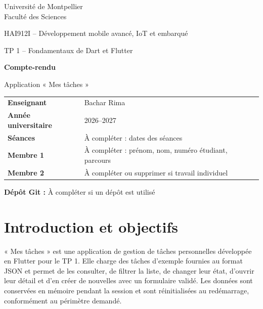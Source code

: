\documentclass[12pt,a4paper]{report}
\begin{document}
\begin{titlepage}
  \centering
  \vspace*{1.2cm}
  {\Large Université de Montpellier\\Faculté des Sciences\par}
  \vspace{1.4cm}
  {\large HAI912I -- Développement mobile avancé, IoT et embarqué\par}
  \vspace{0.4cm}
  {\large TP 1 -- Fondamentaux de Dart et Flutter\par}
  \vspace{1.5cm}
  {\Huge\bfseries Compte-rendu\par}
  \vspace{0.5cm}
  {\LARGE Application « Mes tâches »\par}
  \vspace{1.4cm}
  \begin{tabular}{>{\bfseries}p{4.2cm}p{9cm}}
    Enseignant & Bachar Rima\\
    Année universitaire & 2026--2027\\
    Séances & \textcolor{red!70!black}{À compléter : dates des séances}\\
    Membre 1 & \textcolor{red!70!black}{À compléter : prénom, nom, numéro étudiant, parcours}\\
    Membre 2 & \textcolor{red!70!black}{À compléter ou supprimer si travail individuel}\\
  \end{tabular}
  \vfill
  \textbf{Dépôt Git :} \textcolor{red!70!black}{À compléter si un dépôt est utilisé}
  \vspace{0.8cm}
\end{titlepage}

\tableofcontents
\clearpage

\chapter{Introduction et objectifs}

« Mes tâches » est une application de gestion de tâches personnelles développée en Flutter pour le TP 1. Elle charge des tâches d’exemple fournies au format JSON et permet de les consulter, de filtrer la liste, de changer leur état, d’ouvrir leur détail et d’en créer de nouvelles avec un formulaire validé. Les données sont conservées en mémoire pendant la session et sont réinitialisées au redémarrage, conformément au périmètre demandé.
\end{document}
